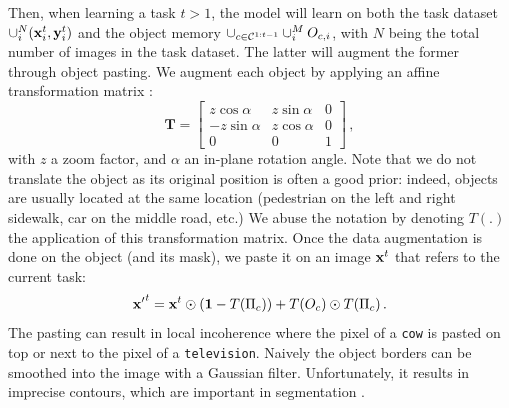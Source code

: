 Then, when learning a task $t > 1$, the model will learn on both the task dataset $\cup_i^N
    (\mathbf{x}^t_i, \mathbf{y}^t_i)$ and the object memory $\cup_{c \in \mathcal{C}^{1:t-1}} \cup_i^M O_{c,i}$, with $N$
being the total number of images in the task dataset. The latter will augment the former through
object pasting. We augment each object by applying an affine transformation matrix
\citep{fang2019instaboost}:
%
\begin{equation}
    \mathbf{T}=\left[\begin{array}{ccc}
            z \cos \alpha  & z \sin \alpha & 0 \\
            -z \sin \alpha & z \cos \alpha & 0 \\
            0              & 0             & 1
        \end{array}\right]\,,
    \label{eq:seg_transformation_matrix_complex}
\end{equation}
%
\noindent with $z$ a zoom factor, and $\alpha$ an in-plane rotation angle. Note that we do not
translate the object as its original position is often a good prior: indeed, objects are usually
located at the same location (\eg pedestrian on the left and right sidewalk, car on the middle road,
etc.) We abuse the notation by denoting $T(.)$ the application of this transformation matrix. Once
the data augmentation is done on the object (and its mask), we paste it on an image $\mathbf{x}^t$ that
refers to the current task:
%
\begin{equation}
    {\mathbf{x}'}^t = \mathbf{x}^t \odot (\mathbf{1} - T(\Pi_c)) + T(O_c) \odot T(\Pi_c)\,.
    \label{eq:seg_pasting}
\end{equation}
%
The pasting can result in local incoherence where the pixel of a \texttt{cow} is pasted on top or
next to the pixel of a \texttt{television}. Naively the object borders can be smoothed into the
image with a Gaussian filter. Unfortunately, it results in imprecise contours, which are important
in segmentation \citep{chen2020semeda}.

